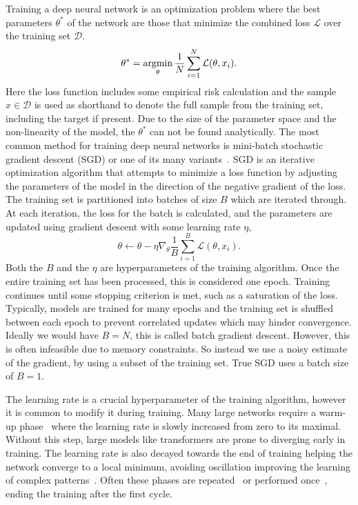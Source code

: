 Training a deep neural network is an optimization problem where the best parameters $\theta^*$ of the network are those that minimize the combined loss $\mathcal{L}$ over the training set $\mathcal{D}$.
\begin{equation}
    \theta^* = \operatorname*{argmin}_{\theta} \frac{1}{N} \sum_{i=1}^N \mathcal{L}(\theta, x_i).
\end{equation}
Here the loss function includes some empirical risk calculation and the sample $x \in \mathcal{D}$ is used as shorthand to denote the full sample from the training set, including the target if present.
Due to the size of the parameter space and the non-linearity of the model, the $\theta^*$ can not be found analytically.
The most common method for training deep neural networks is mini-batch stochastic gradient descent (SGD) or one of its many variants~\cite{Perceptron}.
SGD is an iterative optimization algorithm that attempts to minimize a loss function by adjusting the parameters of the model in the direction of the negative gradient of the loss.
The training set is partitioned into batches of size $B$ which are iterated through.
At each iteration, the loss for the batch is calculated, and the parameters are updated using gradient descent with some learning rate $\eta$,
\begin{equation}
    \theta \leftarrow \theta - \eta \nabla_{\theta} \frac{1}{B} \sum_{i=1}^B \mathcal{L}(\theta, x_i).
\end{equation}
Both the $B$ and the $\eta$ are hyperparameters of the training algorithm.
Once the entire training set has been processed, this is considered one epoch.
Training continues until some stopping criterion is met, such as a saturation of the loss.
Typically, models are trained for many epochs and the training set is shuffled between each epoch to prevent correlated updates which may hinder convergence.
Ideally we would have $B=N$, this is called batch gradient descent.
However, this is often infeasible due to memory constraints.
So instead we use a noisy estimate of the gradient, by using a subset of the training set.
True SGD uses a batch size of $B=1$.

The learning rate is a crucial hyperparameter of the training algorithm, however it is common to modify it during training.
Many large networks require a warm-up phase~\cite{SGDRStochasticGradient} where the learning rate is slowly increased from zero to its maximal.
Without this step, large models like transformers are prone to diverging early in training.
The learning rate is also decayed towards the end of training helping the network converge to a local minimum, avoiding oscillation improving the learning of complex patterns~\cite{HowDoesLearning}.
Often these phases are repeated~\cite{CyclicalLearningRates} or performed once~\cite{SuperConvergenceVeryFast}, ending the training after the first cycle.

